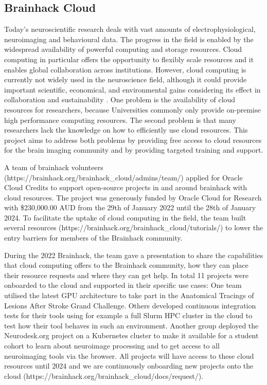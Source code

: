 \documentclass[../main.tex]{subfiles}
\begin{document}
\subsection{Brainhack Cloud}


Today’s neuroscientific research deals with vast amounts of electrophysiological, neuroimaging and behavioural data. The progress in the field is enabled by the widespread availability of powerful computing and storage resources. Cloud computing in particular offers the opportunity to flexibly scale resources and it enables global collaboration across institutions. However, cloud computing is currently not widely used in the neuroscience field, although it could provide important scientific, economical, and environmental gains considering its effect in collaboration and sustainability \parencite{apon2015, OracleSustainabilty}. One problem is the availability of cloud resources for researchers, because Universities commonly only provide on-premise high performance computing resources. The second problem is that many researchers lack the knowledge on how to efficiently use cloud resources. This project aims to address both problems by providing free access to cloud resources for the brain imaging community and by providing targeted training and support.

A team of brainhack volunteers (https://brainhack.org/brainhack\_cloud/admins/team/) applied for Oracle Cloud Credits to support open-source projects in and around brainhack with cloud resources. The project was generously funded by Oracle Cloud for Research \parencite{OracleResearch} with \$230,000.00 AUD from the 29th of January 2022 until the 28th of January 2024. To facilitate the uptake of cloud computing in the field, the team built several resources (https://brainhack.org/brainhack\_cloud/tutorials/) to lower the entry barriers for members of the Brainhack community. 

During the 2022 Brainhack, the team gave a presentation to share the capabilities that cloud computing offers to the Brainhack community, how they can place their resource requests and where they can get help. In total 11 projects were onboarded to the cloud and supported in their specific use cases: One team utilised the latest GPU architecture to take part in the Anatomical Tracings of Lesions After Stroke Grand Challenge. Others developed continuous integration tests for their tools using for example a full Slurm HPC cluster in the cloud to test how their tool behaves in such an environment. Another group deployed the Neurodesk.org \parencite{NeuroDesk} project on a Kubernetes cluster to make it available for a student cohort to learn about neuroimage processing and to get access to all neuroimaging tools via the browser. All projects will have access to these cloud resources until 2024 and we are continuously onboarding new projects onto the cloud (https://brainhack.org/brainhack\_cloud/docs/request/).
\end{document}
